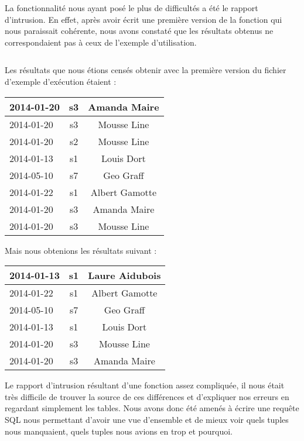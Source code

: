 La fonctionnalité nous ayant posé le plus de difficultés a été le rapport d'intrusion. En effet, après avoir écrit une première version de la fonction  qui nous paraissait cohérente, nous avons constaté que les résultats obtenus ne correspondaient pas à ceux de l'exemple d'utilisation.

\inputminted[tabsize=4,linenos,fontsize=\small]{sql}{code/1.sql}

Les résultats que nous étions censés obtenir avec la première version du fichier d'exemple d'exécution étaient :
\begin{center}
	\begin{tabular}
		{| l |	c |	c |} \hline
		2014-01-20 & s3 & Amanda Maire \\ \hline
		2014-01-20 & s3 & Mousse Line \\ \hline
		2014-01-20 & s2 & Mousse Line \\ \hline
		2014-01-13 & s1 & Louis Dort \\ \hline
		2014-05-10 & s7 & Geo Graff \\ \hline
		2014-01-22 & s1 & Albert Gamotte \\ \hline
		2014-01-20 & s3 & Amanda Maire \\ \hline
		2014-01-20 & s3 & Mousse Line \\ \hline
	\end{tabular}
\end{center}

Mais nous obtenions les résultats suivant :
\begin{center}
	\begin{tabular}
		{| l |	c |	c |} \hline
		2014-01-13 & s1 & Laure Aidubois \\ \hline
		2014-01-22 & s1 & Albert Gamotte \\ \hline
		2014-05-10 & s7 & Geo Graff \\ \hline
		2014-01-13 & s1 & Louis Dort \\ \hline
		2014-01-20 & s3 & Mousse Line \\ \hline
		2014-01-20 & s3 & Amanda Maire \\ \hline
	\end{tabular}
\end{center}



Le rapport d'intrusion résultant d'une fonction assez compliquée, il nous était très difficile de trouver la source de ces différences et d'expliquer nos erreurs en regardant simplement les tables. Nous avons donc été amenés à écrire une requête SQL nous permettant d'avoir une vue d'ensemble et de mieux voir quels tuples nous manquaient, quels tuples nous avions en trop et pourquoi.\\

